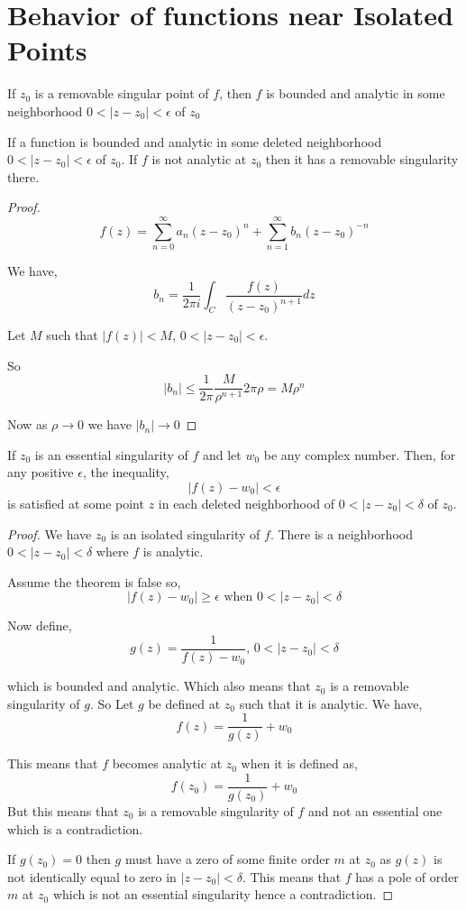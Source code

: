 
\section{Behavior of functions near Isolated Points}

\begin{theorem}
   If $z_0$ is a removable singular point of $f$, then $f$ is bounded and analytic in some neighborhood $0 < | z - z_0| < \epsilon$ of $z_0$  
\end{theorem}


\begin{theorem}
   If a function is bounded and analytic  in some deleted neighborhood $0 < |z - z_0| < \epsilon$ of $z_0$. If $f$ is not analytic at $z_0$ then it has a removable singularity there.
\end{theorem}
\begin{proof}
   
   $$ f(z) = \sum_{n=0}^{\infty} a_n (z - z_0)^{n} + \sum_{n=1}^{\infty} b_n (z -z_0)^{-n} $$ 

   We have, 
   $$ b_n = \frac{1}{2\pi i}\int_C \frac{f(z)}{(z - z_0)^{n + 1}} dz $$ 

   Let $M$ such that  $|f(z)| < M $, $ 0 < |z - z_0| < \epsilon$.

   So $$|b_n| \le \frac{1}{2\pi} \frac{M}{\rho^{n + 1}} 2 \pi \rho= M \rho^{n}$$

   Now as $\rho \rightarrow 0$  we have $|b_n| \rightarrow 0$
\end{proof}



\begin{theorem}
   If $z_0$ is an essential singularity of $f$ and let $w_0$ be any complex number. Then, for any positive $\epsilon$, the inequality, 
   $$ |f(z)- w_0| < \epsilon $$  
   is satisfied at some point $z$ in each deleted neighborhood of $0 < | z- z_0| < \delta$ of $z_0$.
\end{theorem}
\begin{proof}
   We have $z_0$ is an isolated singularity of $f$. There is a neighborhood $0 < | z - z_0| < \delta$ where $f $ is analytic. 

   Assume the theorem is false so, 
   $$ |f(z) - w_0| \ge \epsilon \text{ when } 0 < | z - z_0| < \delta $$  

   Now define, 
   $$ g(z) = \frac{1}{f(z) - w_0}\text{, } 0 < |z - z_0| < \delta $$ 

   which is bounded and analytic. Which also means that $z_0$ is a removable singularity of $g$. So Let $g$ be defined at $z_0$ such that it is analytic. We have, 
   $$ f(z) = \frac{1}{g(z)} + w_0 $$ 

   This means that $f$ becomes analytic at $z_0$ when it is defined as, 
   $$ f(z_0) =\frac{1}{g(z_0)} + w_0 $$ 
   But this means that $z_0$ is a removable singularity of $f$ and not an essential one which is a contradiction.

   If $g(z_0) = 0$ then $g$ must have a zero of some finite order $m$ at $z_0$ as $g(z)$ is not identically equal to zero in $| z - z_0| < \delta$. This means that $f$ has a pole of order $m$ at $z_0$ which is not an essential singularity hence a contradiction.
\end{proof}


